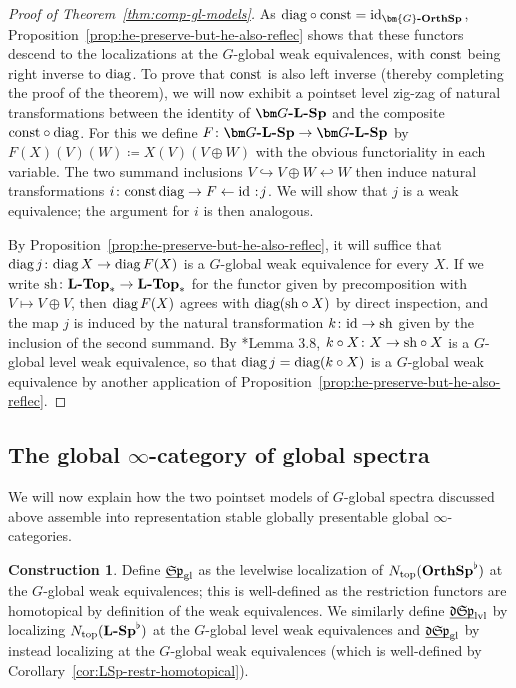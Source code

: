 \documentclass[reqno]{memo-l}
\theoremstyle{mythm}
\theoremstyle{definition}
\newtheorem{constr}[thm]{Construction}
\numberwithin{equation}{section}
\newcommand{\gl}{\textup{gl}}
\newcommand{\Ntop}{{N_\textup{top}}}
\newcommand{\cat}[1]{\textbf{\textup{#1}}}
\newcommand{\consts}{\textup{const}}
\newcommand{\id}{\textup{id}}
\newcommand{\diag}{\textup{diag}}
\newcommand{\sh}{{\textup{sh}}}
\newcommand{\dual}{\flat}
\newcommand{\ulhelper}[2]{\underline{\setbox0=\hbox{$#1#2$}\dp0=0.4pt \box0\relax}}
\newcommand{\ul}[1]{{\mathpalette\ulhelper{#1}}\hbox{\rule[-2pt]{0pt}{0pt}}}
\newcommand\noloc{%
	\nobreak
	\mspace{6mu plus 1mu}
	{:}
	\nonscript\mkern-\thinmuskip
	\mathpunct{}
	\mspace{2mu}
}
\newcommand{\mySp}{{\mathfrak S\kern-.5pt\mathfrak p}}
\newcommand{\myLSp}{{\mathfrak d\kern-.25pt}\mySp}
\newcommand{\ulmySplev}{\ul{\myLSp}_\textup{lvl}}
\newcommand{\osp}{{\textbf{\textup{OrthSp}}}}
\newcommand{\Gosp}[1]{\cat{$\bm{#1}$-OrthSp}}
\begin{document}
\begin{proof}[Proof of Theorem~\ref{thm:comp-gl-models}]
    As $\diag\circ\consts=\id_{\Gosp{G}}$, Proposition~\ref{prop:he-preserve-but-he-also-reflec} shows that these functors descend to the localizations at the $G$-global weak equivalences, with $\consts$ being right inverse to $\diag$. To prove that $\consts$ is also left inverse (thereby completing the proof of the theorem), we will now exhibit a pointset level zig-zag of natural transformations between the identity of $\cat{$\bm G$-$\cat{L}$-Sp}$ and the composite $\consts\circ\diag$. For this we define $F\colon\cat{$\bm G$-$\cat{L}$-Sp}\to\cat{$\bm G$-$\cat{L}$-Sp}$ by $F(X)(V)(W)\coloneqq X(V)(V\oplus W)$ with the obvious functoriality in each variable. The two summand inclusions $V\hookrightarrow V\oplus W\hookleftarrow W$ then induce natural transformations $i\colon\consts\,\diag\to F\gets\id\noloc j$. We will show that $j$ is a weak equivalence; the argument for $i$ is then analogous.

    By Proposition~\ref{prop:he-preserve-but-he-also-reflec}, it will suffice that $\diag\,j\colon\diag\,X\to\diag\,F(X)$ is a $G$-global weak equivalence for every $X$. If we write $\sh\colon\cat{$\cat{L}$-Top}_*\to\cat{$\cat{L}$-Top}_*$ for the functor given by precomposition with $V\mapsto V\oplus V$, then $\diag\,F(X)$ agrees with $\diag(\sh\circ X)$ by direct inspection, and the map $j$ is induced by the natural transformation $k\colon\id\to\sh$ given by the inclusion of the second summand. By \cite{barrero2021}*{Lemma 3.8}, $k\circ X\colon X\to\sh\circ X$ is a $G$-global level weak equivalence, so that $\diag\,j=\diag(k\circ X)$ is a $G$-global weak equivalence by another application of  Proposition~\ref{prop:he-preserve-but-he-also-reflec}.
\end{proof}

\subsection{The global \texorpdfstring{$\bm\infty$}{∞}-category of global spectra}\label{subsec:gl-oo-gl-sp}
We will now explain how the two pointset models of $G$-global spectra discussed above assemble into representation stable globally presentable global $\infty$-categories.

\begin{constr}
    Define $\ul\mySp_\gl$ as the levelwise localization of $\Ntop(\osp^\dual)$ at the $G$-global weak equivalences; this is well-defined as the restriction functors are homotopical by definition of the weak equivalences. We similarly define $\ulmySplev$ by localizing $\Ntop(\cat{$\cat{L}$-Sp}^\dual)$ at the $G$-global level weak equivalences and $\ul\myLSp_\gl$ by instead localizing at the $G$-global weak equivalences (which is well-defined by Corollary~\ref{cor:LSp-restr-homotopical}).
\end{constr}
\end{document}
